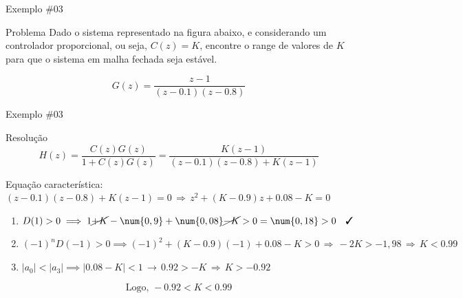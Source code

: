 \begin{frame}{Exemplo \#03}
\begin{block}{Problema}
Dado o sistema representado na figura abaixo, e considerando um controlador proporcional, ou seja, $ C(z)=K $, encontre o range de valores de $ K $ para que o sistema em malha fechada seja estável.

\[ G(z)=\dfrac{z-1}{(z-\num{0,1})(z-\num{0,8})} \]
\end{block}

\vspace{0.5cm}

\centering

\scalebox{0.7}{}
\end{frame}


\begin{frame}{Exemplo \#03}
\begin{block}{Resolução}
	\[ H(z)=\dfrac{C(z)G(z)}{1+C(z)G(z)}=\frac{K(z-1)}{(z-\num{0,1})(z-\num{0,8})+K(z-1)}\]
	
	Equação característica: $ (z-\num{0,1})(z-\num{0,8})+K(z-1)=0 \,\Rightarrow\, z^{2}+(K-\num{0,9})z+\num{0,08}-K=0 $
	
	\begin{enumerate}[(1)]
		\item $ D(1)>0 \implies 1\cancel{+K}-\num{0,9}+\num{0,08}\cancel{-K}>0=\num{0,18}>0\quad\text{\cmark} $
		\item $ (-1)^{n}D(-1)>0 \implies (-1)^{2}+(K-\num{0,9})(-1)+\num{0,08}-K>0\,\Rightarrow\, -2K>-1,98\,\Rightarrow\, K<\num{0,99} $
		\item $ |a_{0}|<|a_{3}| \implies |\num{0,08}-K| < 1 \, \rightarrow\, \num{0,92}>-K \, \Rightarrow\, K>-\num{0,92} $
	\end{enumerate}

	\[ \text{Logo, }-\num{0,92}<K<\num{0,99} \]
\end{block}
\end{frame}




